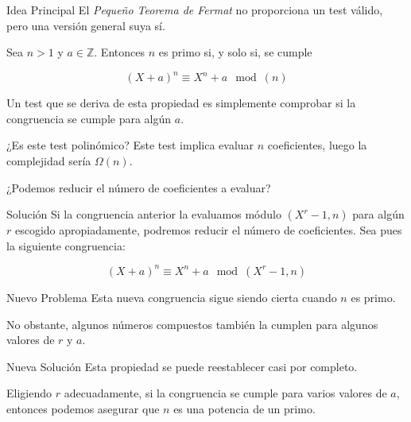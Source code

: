 \documentclass{beamer}
\begin{document}
\begin{frame}{Idea Principal}
	\onslide<1->El \textit{Pequeño Teorema de Fermat} no proporciona un test válido, pero una versión general suya sí.\break
	
	\begin{theorem}
		Sea $n > 1$ y $a \in \mathbb{Z}$. Entonces $n$ es primo si, y solo si, se cumple
		
		\begin{equation*}
		(X + a)^n \equiv X^n + a \mod(n)
		\end{equation*}
	\end{theorem}
	
	Un test que se deriva de esta propiedad es simplemente comprobar si la congruencia se cumple para algún $a$.
\end{frame}

\begin{frame}{¿Es este test polinómico?}
	\onslide<1->Este test implica evaluar $n$ coeficientes, luego la complejidad sería $\Omega(n)$.\break
	
	¿Podemos reducir el número de coeficientes a evaluar?
\end{frame}

\begin{frame}{Solución}
	\onslide<1->Si la congruencia anterior la evaluamos módulo $(X^r - 1, n)$ para algún $r$ escogido apropiadamente, podremos reducir el número de coeficientes. Sea pues la siguiente congruencia:\break
	
	\begin{equation*}
	(X + a)^n \equiv X^n + a \mod(X^r - 1, n)
	\end{equation*}
\end{frame}

\begin{frame}{Nuevo Problema}
	\onslide<1->Esta nueva congruencia sigue siendo cierta cuando $n$ es primo.\break
	
	No obstante, algunos números compuestos también la cumplen para algunos valores de $r$ y $a$.
\end{frame}

\begin{frame}{Nueva Solución}
	\onslide<1->Esta propiedad se puede reestablecer casi por completo.\break
	
	Eligiendo $r$ adecuadamente, si la congruencia se cumple para varios valores de $a$, entonces podemos asegurar que $n$ es una potencia de un primo.
\end{frame}
\end{document}
